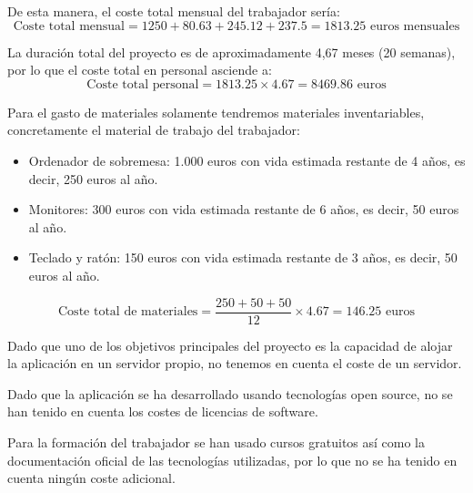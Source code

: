 De esta manera, el coste total mensual del trabajador sería:
\begin{equation}
    \text{Coste total mensual} = 1250 + 80.63 + 245.12 + 237.5 = 1813.25 \text{ euros mensuales}
\end{equation}

La duración total del proyecto es de aproximadamente 4,67 meses (20 semanas), por lo que el coste total en personal asciende a:
\begin{equation}
    \text{Coste total personal} = 1813.25 \times 4.67 = 8469.86 \text{ euros}
\end{equation}

Para el gasto de materiales solamente tendremos materiales inventariables, concretamente el material de trabajo del trabajador:
\begin{itemize}
    \item Ordenador de sobremesa: 1.000 euros con vida estimada restante de 4 años, es decir, 250 euros al año.
    \item Monitores: 300 euros con vida estimada restante de 6 años, es decir, 50 euros al año.
    \item Teclado y ratón: 150 euros con vida estimada restante de 3 años, es decir, 50 euros al año.
\end{itemize}
\begin{equation}
    \text{Coste total de materiales} = \dfrac{250 + 50 + 50}{12} \times 4.67 = 146.25 \text{ euros}
\end{equation}

Dado que uno de los objetivos principales del proyecto es la capacidad de alojar la aplicación en un servidor propio, no tenemos en cuenta el coste de un servidor.

Dado que la aplicación se ha desarrollado usando tecnologías open source, no se han tenido en cuenta los costes de licencias de software.

Para la formación del trabajador se han usado cursos gratuitos así como la documentación oficial de las tecnologías utilizadas, por lo que no se ha tenido en cuenta ningún coste adicional.


